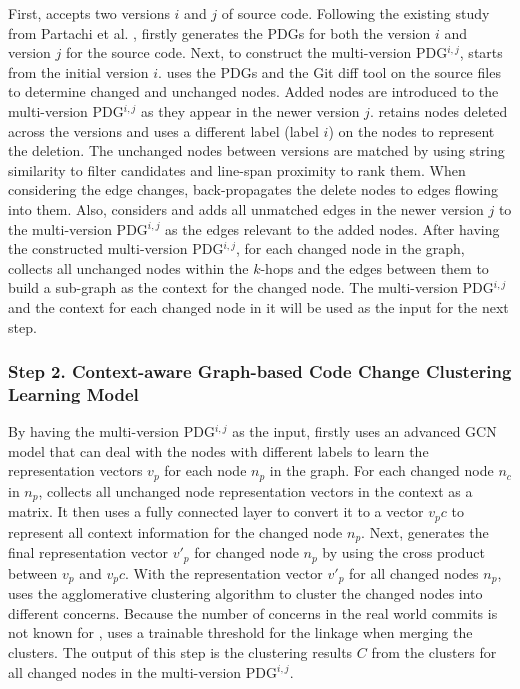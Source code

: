 First, \tool accepts two versions $i$ and $j$ of source code. Following the existing study from Partachi et al. \cite{flexeme-fse20}, \tool firstly generates the PDGs for both the version $i$ and version $j$ for the source code. Next, to construct the multi-version PDG$^{i,j}$, \tool starts from the initial version $i$. \tool uses the PDGs and the Git diff tool on the source files to determine changed and unchanged nodes. Added nodes are introduced to the multi-version PDG$^{i,j}$ as they appear in the newer version $j$. \tool retains nodes deleted across the versions and uses a different label (label $i$) on the nodes to represent the deletion. The unchanged nodes between versions are matched by using string similarity to filter candidates and line-span proximity to rank them. When considering the edge changes, \tool back-propagates the delete nodes to edges flowing into them. Also, \tool considers and adds all unmatched edges in the newer version $j$ to the multi-version PDG$^{i,j}$ as the edges relevant to the added nodes. After having the constructed multi-version PDG$^{i,j}$, for each changed node in the graph, \tool collects all unchanged nodes within the $k$-hops and the edges between them to build a sub-graph as the context for the changed node. The multi-version PDG$^{i,j}$ and the context for each changed node in it will be used as the input for the next step.

\subsubsection{Step 2. Context-aware Graph-based Code Change Clustering Learning Model}

By having the multi-version PDG$^{i,j}$ as the input, \tool firstly uses an advanced GCN model \cite{} that can deal with the nodes with different labels to learn the representation vectors $v_p$ for each node $n_p$ in the graph. For each changed node $n_c$ in $n_p$, \tool collects all unchanged node representation vectors in the context as a matrix. It then uses a fully connected layer to convert it to a vector $v_pc$ to represent all context information for the changed node $n_p$. Next, \tool generates the final representation vector $v'_p$ for changed node $n_p$ by using the cross product between $v_p$ and $v_pc$. With the representation vector $v'_p$ for all changed nodes $n_p$, \tool uses the agglomerative clustering algorithm to cluster the changed nodes into different concerns. Because the number of concerns in the real world commits is not known for \tool, \tool uses a trainable threshold for the linkage when merging the clusters. The output of this step is the clustering results $C$ from the clusters for all changed nodes in the multi-version PDG$^{i,j}$.  

